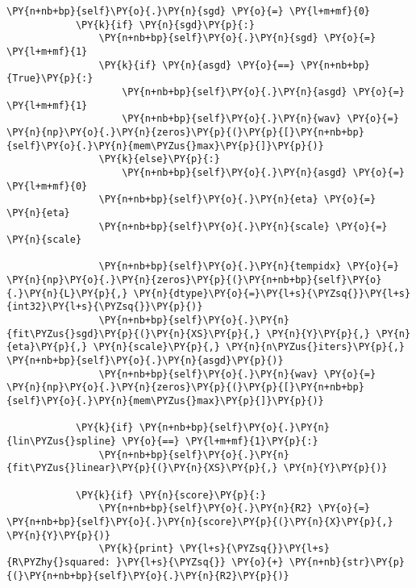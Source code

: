 \begin{Verbatim}[commandchars=\\\{\}]
            \PY{n+nb+bp}{self}\PY{o}{.}\PY{n}{sgd} \PY{o}{=} \PY{l+m+mf}{0} 
            \PY{k}{if} \PY{n}{sgd}\PY{p}{:}
                \PY{n+nb+bp}{self}\PY{o}{.}\PY{n}{sgd} \PY{o}{=} \PY{l+m+mf}{1}
                \PY{k}{if} \PY{n}{asgd} \PY{o}{==} \PY{n+nb+bp}{True}\PY{p}{:}
                    \PY{n+nb+bp}{self}\PY{o}{.}\PY{n}{asgd} \PY{o}{=} \PY{l+m+mf}{1}
                    \PY{n+nb+bp}{self}\PY{o}{.}\PY{n}{wav} \PY{o}{=} \PY{n}{np}\PY{o}{.}\PY{n}{zeros}\PY{p}{(}\PY{p}{[}\PY{n+nb+bp}{self}\PY{o}{.}\PY{n}{mem\PYZus{}max}\PY{p}{]}\PY{p}{)}
                \PY{k}{else}\PY{p}{:}
                    \PY{n+nb+bp}{self}\PY{o}{.}\PY{n}{asgd} \PY{o}{=} \PY{l+m+mf}{0}
                \PY{n+nb+bp}{self}\PY{o}{.}\PY{n}{eta} \PY{o}{=} \PY{n}{eta} 
                \PY{n+nb+bp}{self}\PY{o}{.}\PY{n}{scale} \PY{o}{=} \PY{n}{scale} 
                
                \PY{n+nb+bp}{self}\PY{o}{.}\PY{n}{tempidx} \PY{o}{=} \PY{n}{np}\PY{o}{.}\PY{n}{zeros}\PY{p}{(}\PY{n+nb+bp}{self}\PY{o}{.}\PY{n}{L}\PY{p}{,} \PY{n}{dtype}\PY{o}{=}\PY{l+s}{\PYZsq{}}\PY{l+s}{int32}\PY{l+s}{\PYZsq{}}\PY{p}{)}
                \PY{n+nb+bp}{self}\PY{o}{.}\PY{n}{fit\PYZus{}sgd}\PY{p}{(}\PY{n}{XS}\PY{p}{,} \PY{n}{Y}\PY{p}{,} \PY{n}{eta}\PY{p}{,} \PY{n}{scale}\PY{p}{,} \PY{n}{n\PYZus{}iters}\PY{p}{,} \PY{n+nb+bp}{self}\PY{o}{.}\PY{n}{asgd}\PY{p}{)}
                \PY{n+nb+bp}{self}\PY{o}{.}\PY{n}{wav} \PY{o}{=} \PY{n}{np}\PY{o}{.}\PY{n}{zeros}\PY{p}{(}\PY{p}{[}\PY{n+nb+bp}{self}\PY{o}{.}\PY{n}{mem\PYZus{}max}\PY{p}{]}\PY{p}{)}
            
            \PY{k}{if} \PY{n+nb+bp}{self}\PY{o}{.}\PY{n}{lin\PYZus{}spline} \PY{o}{==} \PY{l+m+mf}{1}\PY{p}{:}
                \PY{n+nb+bp}{self}\PY{o}{.}\PY{n}{fit\PYZus{}linear}\PY{p}{(}\PY{n}{XS}\PY{p}{,} \PY{n}{Y}\PY{p}{)}
            
            \PY{k}{if} \PY{n}{score}\PY{p}{:}
                \PY{n+nb+bp}{self}\PY{o}{.}\PY{n}{R2} \PY{o}{=} \PY{n+nb+bp}{self}\PY{o}{.}\PY{n}{score}\PY{p}{(}\PY{n}{X}\PY{p}{,} \PY{n}{Y}\PY{p}{)}
                \PY{k}{print} \PY{l+s}{\PYZsq{}}\PY{l+s}{R\PYZhy{}squared: }\PY{l+s}{\PYZsq{}} \PY{o}{+} \PY{n+nb}{str}\PY{p}{(}\PY{n+nb+bp}{self}\PY{o}{.}\PY{n}{R2}\PY{p}{)}
            

\end{Verbatim}
